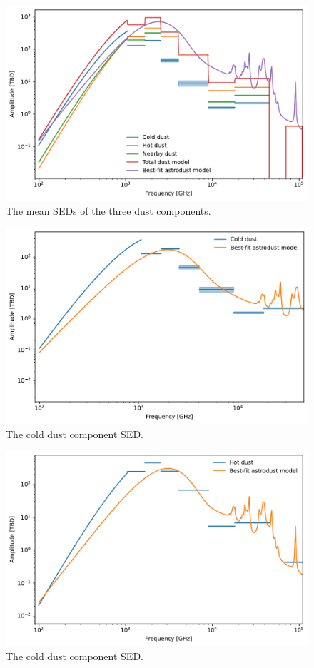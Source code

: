 \documentclass{aa}
\begin{document}
\begin{figure}
  \centering
  \includegraphics[width=\columnwidth]{figures/all_components_sed.pdf}
  \caption{The mean SEDs of the three dust components.}
  \label{fig:all_components_sed}
\end{figure}
\begin{figure}
  \centering
  \includegraphics[width=\columnwidth]{figures/cold_dust_sed.pdf}
  \caption{The cold dust component SED.}
  \label{fig:cold_dust_sed}
\end{figure}
\begin{figure}
  \centering
  \includegraphics[width=\columnwidth]{figures/hot_dust_sed.pdf}
  \caption{The cold dust component SED.}
  \label{fig:hot_dust_sed}
\end{figure}
\end{document}

